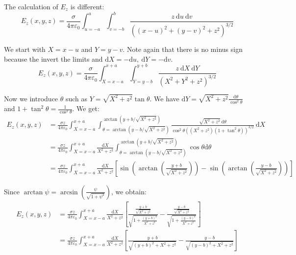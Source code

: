 \documentclass[12pt]{article}
\begin{document}
The calculation of \(E_z\) is different:
\[
E_z(x, y, z)=\frac{\sigma}{4 \pi \varepsilon_0} \int_{u=-a}^a \int_{v=-b}^b \frac{z \mathrm{~d} u \mathrm{~d} v}{\left((x-u)^2+(y-v)^2+z^2\right)^{3 / 2}}
\]

We start with \(X=x-u\) and \(Y=y-v\). Note again that there is no minus sign because the invert the limits and \(\mathrm{d} X=-\mathrm{d} u, \mathrm{~d} Y=-\mathrm{d} v\).
\[
E_z(x, y, z)=\frac{\sigma}{4 \pi \varepsilon_0} \int_{X=x-a}^{x+a} \int_{Y=y-b}^{y+b} \frac{z \mathrm{~d} X \mathrm{~d} Y}{\left(X^2+Y^2+z^2\right)^{3 / 2}}
\]

Now we introduce \(\theta\) such as \(Y=\sqrt{X^2+z^2} \tan \theta\). We have \(\mathrm{d} Y=\sqrt{X^2+z^2} \frac{\mathrm{d} \theta}{\cos ^2 \theta}\) and \(1+\tan ^2 \theta=\frac{1}{\cos ^2 \theta}\). We get:
\[
\begin{aligned}
E_z(x, y, z) & =\frac{\sigma z}{4 \pi \varepsilon_0} \int_{X=x-a}^{x+a} \int_{\theta=\arctan \left(y-b / \sqrt{X^2+z^2}\right)}^{\arctan \left(y+b / \sqrt{X^2+z^2}\right)} \frac{\sqrt{X^2+z^2} \mathrm{~d} \theta}{\cos ^2 \theta\left(\left(X^2+z^2\right)\left(1+\tan ^2 \theta\right)\right)^{3 / 2}} \mathrm{~d} X \\
& =\frac{\sigma z}{4 \pi \varepsilon_0} \int_{X=x-a}^{x+a} \frac{\mathrm{d} X}{X^2+z^2} \int_{\theta=\arctan \left(y-b / \sqrt{X^2+z^2}\right)}^{\arctan \left(y+b / \sqrt{X^2+z^2}\right)} \cos \theta \mathrm{d} \theta \\
& =\frac{\sigma z}{4 \pi \varepsilon_0} \int_{X=x-a}^{x+a} \frac{\mathrm{d} X}{X^2+z^2}\left[\sin \left(\arctan \left(\frac{y+b}{\sqrt{X^2+z^2}}\right)\right)-\sin \left(\arctan \left(\frac{y-b}{\sqrt{X^2+z^2}}\right)\right)\right]
\end{aligned}
\]

Since \(\arctan \psi=\arcsin \left(\frac{\psi}{\sqrt{1+\psi^2}}\right)\), we obtain:
\[
\begin{aligned}
E_z(x, y, z) & =\frac{\sigma z}{4 \pi \varepsilon_0} \int_{X=x-a}^{x+a} \frac{\mathrm{d} X}{X^2+z^2}\left[\frac{\frac{y+b}{\sqrt{X^2+z^2}}}{\sqrt{1+\frac{(y+b)^2}{X^2+z^2}}}-\frac{\frac{y-b}{\sqrt{X^2+z^2}}}{\sqrt{1+\frac{(y-b)^2}{X^2+z^2}}}\right] \\
& =\frac{\sigma z}{4 \pi \varepsilon_0} \int_{X=x-a}^{x+a} \frac{\mathrm{d} X}{X^2+z^2}\left[\frac{y+b}{\sqrt{(y+b)^2+X^2+z^2}}-\frac{y-b}{\sqrt{(y-b)^2+X^2+z^2}}\right]
\end{aligned}
\]
\end{document}
